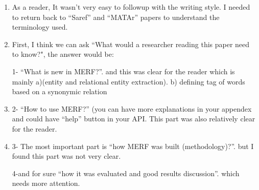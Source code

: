 \begin{enumerate}[leftmargin=0mm,label=\bfseries CommentR3.\arabic*]
\item \label{Review.3.1}
As a reader, It wasn't very easy to followup with the writing 
style. 
I needed to return back to ``Saref'' and ``MATAr'' papers 
to understand the terminology used.


\item \label{Review.3.2}
First, I think we can ask 
``What would a researcher reading this paper need to know?", the answer would be:

1- ``What is new in MERF?''. and this was clear for the reader 
    which is mainly
    a)(entity and relational entity extraction).
    b) defining tag of words based on a synonymic relation


\item \label{Review.3.3}
2- ``How to use MERF?''
(you can have more explanations in your appendex and could have 
``help'' button in your API. This part was also relatively 
clear for the reader.



\item \label{Review.3.4}
3- The most important part is ``how MERF was built 
(methodology)?''. but I found this part was not very clear.



4-and for sure ``how it was evaluated and good results discussion''. 
which needs more attention.




\end{enumerate}
